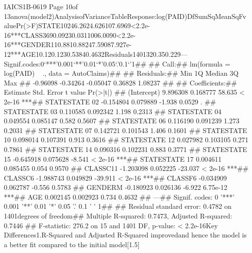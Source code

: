 IAICS1B-0619
Page 10of 13anova(model2)AnalysisofVarianceTableResponse:log(PAID)DfSumSqMeanSqFvaluePr(>F)STATE10246.2624.626107.6969<2.2e-16***CLASS3690.09230.0311006.0090<2.2e-16***GENDER110.8810.88247.59087.927e-12***AGE10.120.1230.53840.4632Residuals1401320.350.229---Signif.codes:0‘***’0.001‘**’0.01‘*’0.05‘.’0.1‘’1## ## Call:## lm(formula = log(PAID) ~ ., data = AutoClaims)## ## Residuals:##      Min       1Q   Median       3Q      Max ## -0.96098 -0.34264 -0.05047  0.36828  1.08237 ## ## Coefficients:##                Estimate Std. Error t value Pr(>|t|)    ## (Intercept)    9.896308   0.168777  58.635  < 2e-16 ***## STATESTATE 02 -0.154804   0.079889  -1.938   0.0529 .  ## STATESTATE 03  0.110585   0.092342   1.198   0.2313    ## STATESTATE 04  0.049554   0.085147   0.582   0.5607    ## STATESTATE 06  0.116190   0.091239   1.273   0.2031    ## STATESTATE 07  0.142721   0.101543   1.406   0.1601    ## STATESTATE 10  0.098014   0.107391   0.913   0.3616    ## STATESTATE 12  0.027982   0.103105   0.271   0.7861    ## STATESTATE 14  0.090316   0.102231   0.883   0.3771    ## STATESTATE 15 -0.645918   0.075628  -8.541  < 2e-16 ***## STATESTATE 17  0.004611   0.085455   0.054   0.9570    ## CLASSC11      -1.203098   0.052225 -23.037  < 2e-16 ***## CLASSC6       -1.988743   0.049829 -39.911  < 2e-16 ***## CLASSF6       -0.034909   0.062787  -0.556   0.5783    ## GENDERM       -0.180923   0.026136  -6.922 6.75e-12 ***## AGE            0.002145   0.002923   0.734   0.4632    ## ---## Signif. codes:  0 '***' 0.001 '**' 0.01 '*' 0.05 '.' 0.1 ' ' 1## ## Residual standard error: 0.4782 on 1401degrees of freedom## Multiple R-squared:  0.7473, Adjusted R-squared:  0.7446 ## F-statistic: 276.2 on 15 and 1401 DF,  p-value: < 2.2e-16Key Differences1.R-Squared and Adjusted R-Squared improvedand hence the model is a better fit compared to the initial model[1.5]

